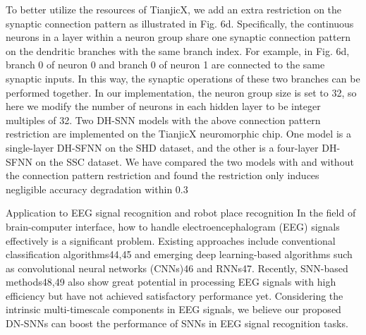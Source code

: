 To better utilize the resources of TianjicX, we add an extra restriction on the synaptic connection pattern as illustrated in Fig. 6d. Specifically, the continuous neurons in a layer within a neuron group share one synaptic connection pattern on the dendritic branches with the same branch index. For example, in Fig. 6d, branch 0 of neuron 0 and branch 0 of neuron 1 are connected to the same synaptic inputs. In this way, the synaptic operations of these two branches can be performed together. In our implementation, the neuron group size is set to 32, so here we modify the number of neurons in each hidden layer to be integer multiples of 32. Two DH-SNN models with the above connection pattern restriction are implemented on the TianjicX neuromorphic chip. One model is a single-layer DH-SFNN on the SHD dataset, and the other is a four-layer DH-SFNN on the SSC dataset. We have compared the two models with and without the connection pattern restriction and found the restriction only induces negligible accuracy degradation within 0.3%

Application to EEG signal recognition and robot place recognition
In the field of brain-computer interface, how to handle electroencephalogram (EEG) signals effectively is a significant problem. Existing approaches include conventional classification algorithms44,45 and emerging deep learning-based algorithms such as convolutional neural networks (CNNs)46 and RNNs47. Recently, SNN-based methods48,49 also show great potential in processing EEG signals with high efficiency but have not achieved satisfactory performance yet. Considering the intrinsic multi-timescale components in EEG signals, we believe our proposed DN-SNNs can boost the performance of SNNs in EEG signal recognition tasks.

